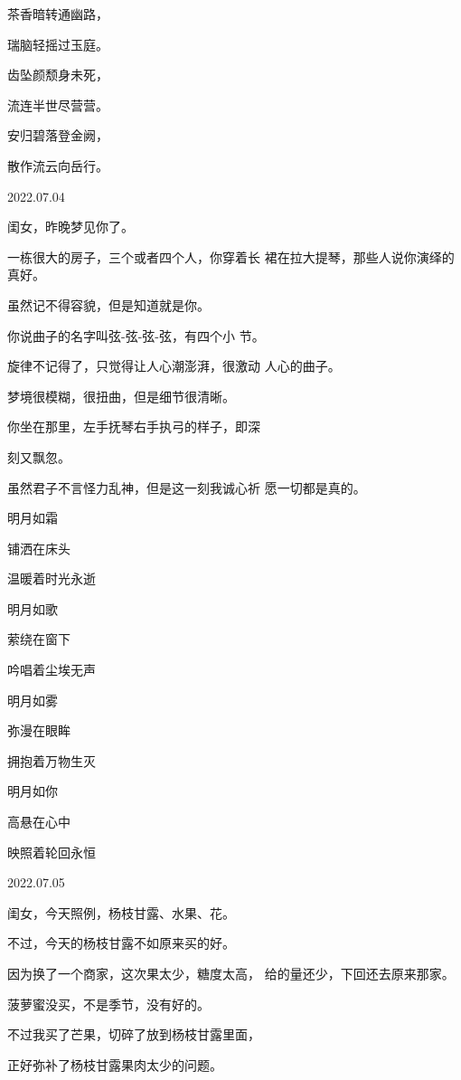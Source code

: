 \documentclass{article}
\begin{document}
茶香暗转通幽路， 


瑞脑轻摇过玉庭。 


齿坠颜颓身未死， 


流连半世尽营营。 


安归碧落登金阙， 


\newpage

散作流云向岳行。 



2022.07.04 


闺女，昨晚梦见你了。 

一栋很大的房子，三个或者四个人，你穿着长
裙在拉大提琴，那些人说你演绎的真好。 


虽然记不得容貌，但是知道就是你。 

你说曲子的名字叫弦-弦-弦-弦，有四个小
节。 

旋律不记得了，只觉得让人心潮澎湃，很激动
人心的曲子。 


梦境很模糊，很扭曲，但是细节很清晰。 

你坐在那里，左手抚琴右手执弓的样子，即深

\newpage
刻又飘忽。 

虽然君子不言怪力乱神，但是这一刻我诚心祈
愿一切都是真的。 



明月如霜 


铺洒在床头 


温暖着时光永逝 


明月如歌 


萦绕在窗下 


吟唱着尘埃无声 


明月如雾 


弥漫在眼眸 

\newpage


拥抱着万物生灭 


明月如你 


高悬在心中 


映照着轮回永恒 



2022.07.05 


闺女，今天照例，杨枝甘露、水果、花。 


不过，今天的杨枝甘露不如原来买的好。 

因为换了一个商家，这次果太少，糖度太高，
给的量还少，下回还去原来那家。 


菠萝蜜没买，不是季节，没有好的。 

不过我买了芒果，切碎了放到杨枝甘露里面，
\newpage

正好弥补了杨枝甘露果肉太少的问题。 
\end{document}
